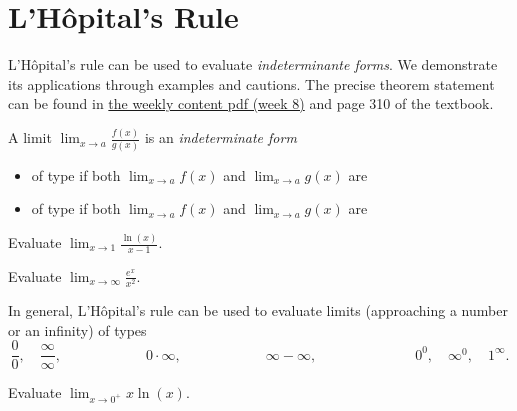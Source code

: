 \documentclass[../main.tex]{subfiles}
\begin{document}

\section{L'H\^opital's Rule}
L'H\^opital's rule can be used to evaluate \emph{indeterminante forms}. We demonstrate its applications through examples and cautions. The precise theorem statement can be found in \href{https://eclass.yorku.ca/pluginfile.php/5312855/mod_resource/content/3/08_applications_2.pdf}{the weekly content pdf (week 8)} and page 310 of the textbook. 

\medskip

A limit \(\lim_{x \to a} \frac{f(x)}{g(x)}\) is an \emph{indeterminate form}
\begin{itemize}
  \item of type \hspace{2cm} if both \(\lim_{x \to a} f(x)\) and \(\lim_{x \to a} g(x)\) are 
    \bigskip
  \item of type \hspace{2cm} if both \(\lim_{x \to a} f(x)\) and \(\lim_{x \to a} g(x)\) are 
\end{itemize}
\medskip

\begin{example}
  Evaluate \(\lim_{x \to 1} \frac{\ln(x)}{x - 1}\).
\end{example}
\vfill

\clearpage
\begin{example}
  Evaluate \(\lim_{x \to \infty} \frac{e^{x}}{x^{2}}\).
\end{example}
\vfill


In general, L'H\^opital's rule can be used to evaluate limits (approaching a number or an infinity) of types
\[
  \frac{0}{0}, \quad \frac{\infty}{\infty}, \hspace{1in} 0 \cdot \infty, \hspace{1in} \infty - \infty, \hspace{1in} \quad 0^{0}, \quad \infty^{0}, \quad 1^{\infty}.
\]
\vspace{1in}

\bigskip


\begin{example}
  Evaluate \(\lim_{x \to 0^{+}} x \ln(x)\).
\end{example}
\vfill
\clearpage
\end{document}
